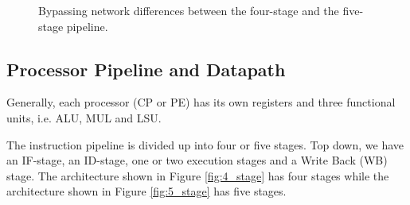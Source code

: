 \begin{figure}[t]
\centering
{}
\hfil
{}
\caption{Bypassing network differences between the four-stage and the five-stage pipeline.}
\label{fig:datapath_pipeline_conf}
\end{figure}

\subsection{Processor Pipeline and Datapath}\label{sec:processor}

Generally, each processor (CP or PE) has its own registers and three functional units, i.e. ALU, MUL and LSU. 

The instruction pipeline is divided up into four or five stages. Top down, we have an IF-stage, an ID-stage, one or two execution stages and a Write Back (WB) stage. The architecture shown in Figure \ref{fig:4_stage} has four stages while the architecture shown in Figure \ref{fig:5_stage} has five stages.\\

